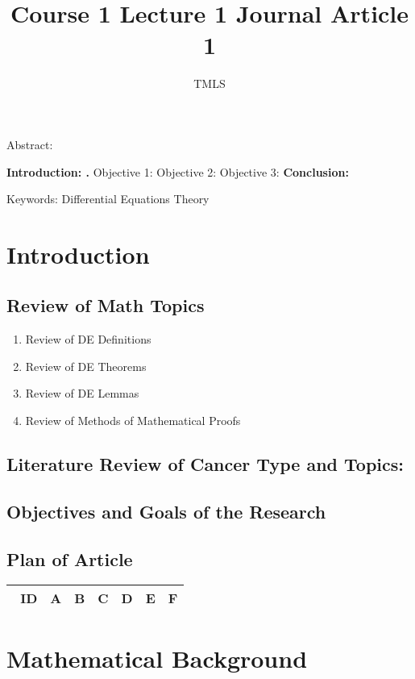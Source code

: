 \documentclass[preprint, 8pt]{elsarticle}
\theoremstyle{definition}
\begin{document}
\begin{frontmatter}
		\title{Course 1 Lecture 1 Journal Article 1}
		\author{TMLS }
		\address{}
		\ead{}	
\end{frontmatter}	
Abstract:
	
\textbf{Introduction: . }
Objective 1: 
Objective 2: 
Objective 3: 
\textbf{Conclusion:}

Keywords: Differential Equations Theory

\section{Introduction}

\subsection{Review of Math Topics}

\begin{enumerate}
\item Review of DE Definitions
\item Review of DE Theorems
\item Review of DE Lemmas
\item Review of Methods of Mathematical Proofs 
\end{enumerate}

\subsection{Literature Review of Cancer Type and Topics:}

\subsection{Objectives and Goals of the Research}

\subsection{Plan of Article}

\begin{table}[H]\centering
\begin{tabular}{p{1cm}p{1cm}p{1cm}p{1cm}p{1cm}p{1cm}p{4cm}}\
ID & A & B & C & D & E & F \\
\hline
\hline
\end{tabular}
\end{table}


\section{Mathematical Background}
\end{document}
